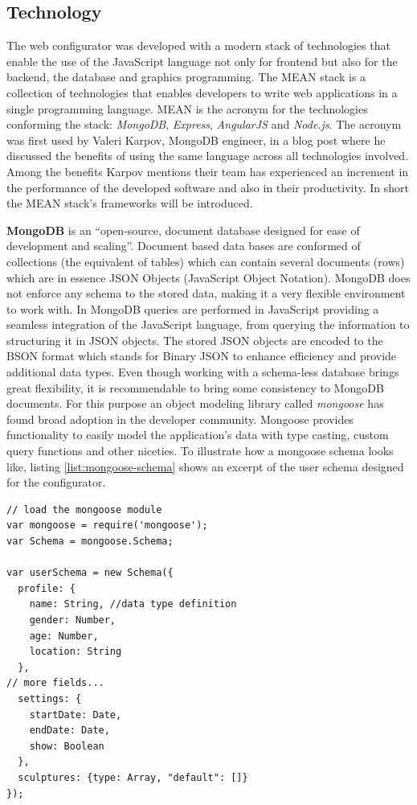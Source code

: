 \documentclass[../medieninformatik-arbeit.tex]{subfiles}
\begin{document}
\subsection{Technology}
The web configurator was developed with a modern stack of technologies that enable the use of the JavaScript language not only for frontend but also for the backend, the database and graphics programming. The MEAN stack is a collection of technologies that enables developers to write web applications in a single programming language. MEAN is the acronym for the technologies  conforming the stack: \textit{MongoDB}\cite{mongodb}, \textit{Express}\cite{express}, \textit{AngularJS}\cite{angular} and \textit{Node.js}\cite{joyent2015node}. The acronym was first used by Valeri Karpov, MongoDB engineer, in a blog post\cite{meanstack} where he discussed the benefits of using the same language across all technologies involved. Among the benefits Karpov mentions their team has experienced an increment in the performance of the developed software and also in their productivity. In short the MEAN stack's frameworks will be introduced. 

\textbf{MongoDB} is an ``open-source, document database designed for ease of development and scaling''\cite{mongodb}. Document based data bases are conformed of collections (the equivalent of tables) which can contain several documents (rows) which are in essence JSON Objects (JavaScript Object Notation). MongoDB does not enforce any schema to the stored data, making it a very flexible environment to work with. In MongoDB queries are performed in JavaScript providing a seamless integration of the JavaScript language, from querying the information to structuring it in JSON objects. The stored JSON objects are encoded to the BSON format which stands for Binary JSON to enhance efficiency and provide additional data types. Even though working with a schema-less database brings great flexibility, it is recommendable to bring some consistency to MongoDB documents. For this purpose an object modeling library called \textit{mongoose}\cite{mongoose} has found broad adoption in the developer community. Mongoose provides functionality to easily model the application's data with type casting, custom query functions and other niceties. To illustrate how a mongoose schema looks like, listing \ref{list:mongoose-schema} shows an excerpt of the user schema designed for the configurator.

\begin{lstlisting}[style=htmlcssjs, caption={An excerpt of the user mongoose schema},label=list:mongoose-schema]
// load the mongoose module
var mongoose = require('mongoose');
var Schema = mongoose.Schema;

var userSchema = new Schema({
  profile: {
    name: String, //data type definition
    gender: Number,
    age: Number,
    location: String
  },
// more fields... 
  settings: {
    startDate: Date,
    endDate: Date,
    show: Boolean
  },
  sculptures: {type: Array, "default": []}
});
\end{lstlisting} 
\end{document}
